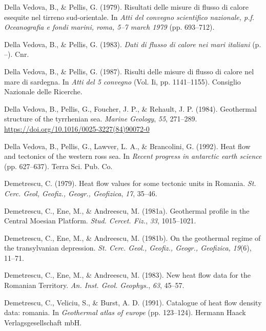 \begin{CSLReferences}{1}{1}
\leavevmode{}%
Della Vedova, B., \& Pellis, G. (1979). Risultati delle misure di flusso di calore esequite nel tirreno sud-orientale. In \emph{Atti del convegno scientifico nazionale, p.f. Oceanografia e fondi marini, roma, 5--7 march 1979} (pp. 693--712).

\leavevmode{}%
Della Vedova, B., \& Pellis, G. (1983). \emph{Dati di flusso di calore nei mari italiani} (p. --). Cnr.

\leavevmode{}%
Della Vedova, B., \& Pellis, G. (1987). Risulti delle misure di flusso di calore nel mare di sardegna. In \emph{Atti del 5\textdegree{} convegno} (Vol. Ii, pp. 1141--1155). Consiglio Nazionale delle Ricerche.

\leavevmode{}%
Della Vedova, B., Pellis, G., Foucher, J. P., \& Rehault, J. P. (1984). Geothermal structure of the tyrrhenian sea. \emph{Marine Geology}, \emph{55}, 271--289. \url{https://doi.org/10.1016/0025-3227(84)90072-0}

\leavevmode{}%
Della Vedova, B., Pellis, G., Lawver, L. A., \& Brancolini, G. (1992). Heat flow and tectonics of the western ross sea. In \emph{Recent progress in antarctic earth science} (pp. 627--637). Terra Sci. Pub. Co.

\leavevmode{}%
Demetrescu, C. (1979). Heat flow values for some tectonic units in {Romania}. \emph{St. Cerc. Geol, Geofiz., Geogr., Geofizica}, \emph{17}, 35--46.

\leavevmode{}%
Demetrescu, C., Ene, M., \& Andreescu, M. (1981a). Geothermal profile in the {Central Moesian Platform}. \emph{Stud. Cercet. Fiz.}, \emph{33}, 1015--1021.

\leavevmode{}%
Demetrescu, C., Ene, M., \& Andreescu, M. (1981b). On the geothermal regime of the transylvanian depression. \emph{St. Cerc. Geol., Geofiz., Geogr., Geofizica,} \emph{19}(6), 11--71.

\leavevmode{}%
Demetrescu, C., Ene, M., \& Andreescu, M. (1983). New heat flow data for the {Romanian Territory}. \emph{An. Inst. Geol. Geophys.}, \emph{63}, 45--57.

\leavevmode{}%
Demetrescu, C., Veliciu, S., \& Burst, A. D. (1991). Catalogue of heat flow density data: romania. In \emph{Geothermal atlas of europe} (pp. 123--124). Hermann Haack Verlagsgesellschaft mbH.


\end{CSLReferences}
